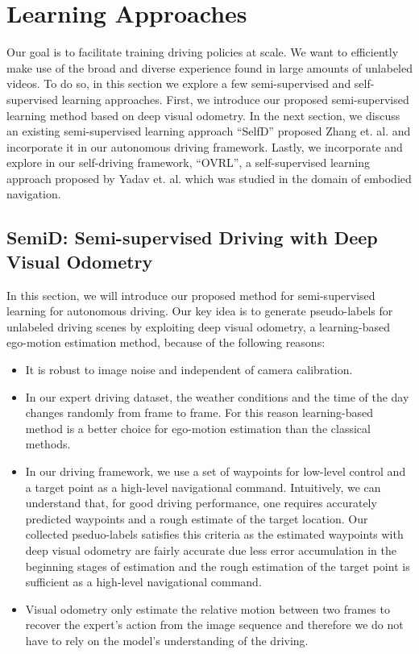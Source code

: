 \documentclass[letterpaper, 12pt]{book}
\theoremstyle{definition}
\theoremstyle{definition}
\theoremstyle{definition}
\theoremstyle{definition}
\theoremstyle{definition}
\begin{document}
\chapter{Learning Approaches \label{org400bf7e}}
\label{sec:orgfbfe79e}
Our goal is to facilitate training driving policies at scale. We want to
efficiently make use of the broad and diverse experience found in large amounts
of unlabeled videos. To do so, in this section we explore a few semi-supervised
and self-supervised learning approaches. First, we introduce our proposed
semi-supervised learning method based on deep visual odometry. In the next
section, we discuss an existing semi-supervised learning approach ``SelfD''
proposed Zhang et. al. \cite{Zhang2022a} and incorporate it in our autonomous
driving framework. Lastly, we incorporate and explore in our self-driving
framework, ``OVRL'', a self-supervised learning approach proposed by Yadav
et. al. \cite{Yadav2022} which was studied in the domain of embodied navigation.

\section{SemiD: Semi-supervised Driving with Deep Visual Odometry \label{org8d90f3f}}
\label{sec:org5ace391}
In this section, we will introduce our proposed method for semi-supervised
learning for autonomous driving. Our key idea is to generate pseudo-labels for
unlabeled driving scenes by exploiting deep visual odometry, a learning-based
ego-motion estimation method, because of the following reasons:

\begin{itemize}
\item It is robust to image noise and independent of camera calibration.
\item In our expert driving dataset, the weather conditions and the time of the day
changes randomly from frame to frame. For this reason learning-based method is
a better choice for ego-motion estimation than the classical methods.
\item In our driving framework, we use a set of waypoints for low-level control and
a target point as a high-level navigational command. Intuitively, we can
understand that, for good driving performance, one requires accurately
predicted waypoints and a rough estimate of the target location. Our collected
pseduo-labels satisfies this criteria as the estimated waypoints with deep
visual odometry are fairly accurate due less error accumulation in the
beginning stages of estimation and the rough estimation of the target point is
sufficient as a high-level navigational command.
\item Visual odometry only estimate the relative motion between two frames to
recover the expert's action from the image sequence and therefore we do not
have to rely on the model's understanding of the driving.
\end{itemize}
\end{document}
